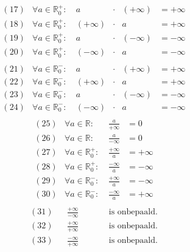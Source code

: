 \documentclass[main.tex]{subfiles}
\begin{document}
\begin{bst}
\[\begin{array}{crccccl}
  \end{array}
  \]
  \[
  \begin{array}{crccccl}
    (17) & \forall a \in \mathbb{R}_{0}^{+}:\ & a         &\cdot& (+\infty) &= + \infty \\
    (18) & \forall a \in \mathbb{R}_{0}^{+}:\ & (+\infty) &\cdot& a         &= + \infty \\
    (19) & \forall a \in \mathbb{R}_{0}^{+}:\ & a         &\cdot& (-\infty) &= - \infty \\
    (20) & \forall a \in \mathbb{R}_{0}^{+}:\ & (-\infty) &\cdot& a         &= - \infty \\
  \end{array}
  \]
  \[
  \begin{array}{crccccl}
    (21) & \forall a \in \mathbb{R}_{0}^{-}:\ & a         &\cdot& (+\infty) &= + \infty \\
    (22) & \forall a \in \mathbb{R}_{0}^{-}:\ & (+\infty) &\cdot& a         &= + \infty \\
    (23) & \forall a \in \mathbb{R}_{0}^{-}:\ & a         &\cdot& (-\infty) &= - \infty \\
    (24) & \forall a \in \mathbb{R}_{0}^{-}:\ & (-\infty) &\cdot& a         &= - \infty \\
  \end{array}
  \]
  \[
  \begin{array}{crccccl}
    (25) & \forall a \in \mathbb{R}:\        & \frac{a}{+\infty}      &= 0 \\
    (26) & \forall a \in \mathbb{R}:\        & \frac{a}{-\infty}      &= 0 \\
    (27) & \forall a \in \mathbb{R}_{0}^{+}:\ & \frac{+\infty}{a}      &= +\infty \\
    (28) & \forall a \in \mathbb{R}_{0}^{+}:\ & \frac{-\infty}{a}      &= -\infty \\
    (29) & \forall a \in \mathbb{R}_{0}^{-}:\ & \frac{+\infty}{a}      &= -\infty \\
    (30) & \forall a \in \mathbb{R}_{0}^{-}:\ & \frac{-\infty}{a}      &= +\infty \\
  \end{array}
  \]
  \[
  \begin{array}{crccccl}
    (31) &                          & \frac{+\infty}{-\infty} &&&& \text{ is onbepaald.}\\
    (32) &                          & \frac{+\infty}{+\infty} &&&& \text{ is onbepaald.}\\
    (33) &                          & \frac{-\infty}{+\infty} &&&& \text{ is onbepaald.}\\

\end{array}\]
\end{bst}
\end{document}
